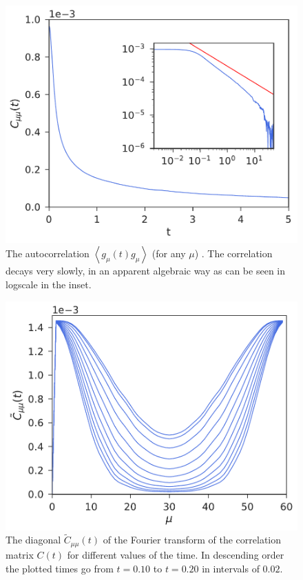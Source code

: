 \documentclass[b5paper,openright,11pt]{book}
\newcommand{\llangle}{\left\langle}
\newcommand{\rrangle}{\right\rangle}
\begin{document}
\begin{figure}[h!]
\centering
\includegraphics[scale=0.41]{Ct-mu30nu30-PBC}
\caption[Autocorrelation for PBC system.]{The autocorrelation
  $\llangle g_{\mu}(t) g_\mu\rrangle$ (for  any $\mu$)
  . The correlation  decays very
slowly, in an  apparent algebraic way as can be  seen in logscale in the inset.}
  \label{fig:Autocorrelation-PBC}
\end{figure}


\begin{figure}[h!]
  \centering
  \includegraphics[scale=0.41]{CtFourier-PBC}
  \caption[Diagonal $\tilde{C}_{\mu\nu}(t)$ for PBC]{The diagonal $\tilde{C}_{\mu\mu}(t)$ of the Fourier transform
  of the correlation  matrix $C(t)$ for different values  of the time.
In      descending     order      the     plotted      times go from $t=0.10$ to $t=0.20$ in intervals of $0.02$. }
\label{fig:CtFourier-PBC}
\end{figure}
\end{document}
